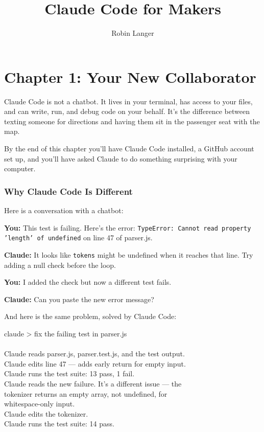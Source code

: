 \documentclass[11pt,a4paper]{article}
\title{\sffamily\bfseries Claude Code for Makers}
\author{Robin Langer}
\date{}
\begin{document}
\maketitle
\thispagestyle{empty}
\tableofcontents
\newpage


\part*{Chapter 1: Your New Collaborator}

Claude Code is not a chatbot. It lives in your terminal, has access to your files, and can write, run, and debug code on your behalf. It's the difference between texting someone for directions and having them sit in the passenger seat with the map.

By the end of this chapter you'll have Claude Code installed, a GitHub account set up, and you'll have asked Claude to do something surprising with your computer.

\section{Why Claude Code Is Different}

Here is a conversation with a chatbot:

\begin{tcolorbox}[promptbox]
\textbf{You:} This test is failing. Here's the error: \texttt{TypeError: Cannot read property 'length' of undefined} on line 47 of parser.js.

\textbf{Claude:} It looks like \texttt{tokens} might be undefined when it reaches that line. Try adding a null check before the loop.

\textbf{You:} I added the check but now a different test fails.

\textbf{Claude:} Can you paste the new error message?
\end{tcolorbox}

And here is the same problem, solved by Claude Code:

\begin{tcolorbox}[termbox]
claude > fix the failing test in parser.js\\
\\
Claude reads parser.js, parser.test.js, and the test output.\\
Claude edits line 47 --- adds early return for empty input.\\
Claude runs the test suite: 13 pass, 1 fail.\\
Claude reads the new failure. It's a different issue --- the\\
\quad tokenizer returns an empty array, not undefined, for\\
\quad whitespace-only input.\\
Claude edits the tokenizer.\\
Claude runs the test suite: 14 pass.
\end{tcolorbox}
\end{document}
